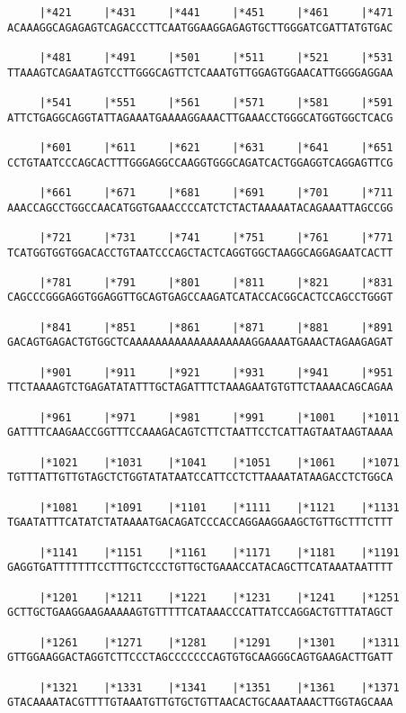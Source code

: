 \documentclass{article}
\begin{document}
\begin{Verbatim}
     |*421     |*431     |*441     |*451     |*461     |*471
ACAAAGGCAGAGAGTCAGACCCTTCAATGGAAGGAGAGTGCTTGGGATCGATTATGTGAC
  
     |*481     |*491     |*501     |*511     |*521     |*531
TTAAAGTCAGAATAGTCCTTGGGCAGTTCTCAAATGTTGGAGTGGAACATTGGGGAGGAA
  
     |*541     |*551     |*561     |*571     |*581     |*591
ATTCTGAGGCAGGTATTAGAAATGAAAAGGAAACTTGAAACCTGGGCATGGTGGCTCACG
  
     |*601     |*611     |*621     |*631     |*641     |*651
CCTGTAATCCCAGCACTTTGGGAGGCCAAGGTGGGCAGATCACTGGAGGTCAGGAGTTCG
  
     |*661     |*671     |*681     |*691     |*701     |*711
AAACCAGCCTGGCCAACATGGTGAAACCCCATCTCTACTAAAAATACAGAAATTAGCCGG
  
     |*721     |*731     |*741     |*751     |*761     |*771
TCATGGTGGTGGACACCTGTAATCCCAGCTACTCAGGTGGCTAAGGCAGGAGAATCACTT
  
     |*781     |*791     |*801     |*811     |*821     |*831
CAGCCCGGGAGGTGGAGGTTGCAGTGAGCCAAGATCATACCACGGCACTCCAGCCTGGGT
  
     |*841     |*851     |*861     |*871     |*881     |*891
GACAGTGAGACTGTGGCTCAAAAAAAAAAAAAAAAAAAGGAAAATGAAACTAGAAGAGAT
  
     |*901     |*911     |*921     |*931     |*941     |*951
TTCTAAAAGTCTGAGATATATTTGCTAGATTTCTAAAGAATGTGTTCTAAAACAGCAGAA
  
     |*961     |*971     |*981     |*991     |*1001    |*1011
GATTTTCAAGAACCGGTTTCCAAAGACAGTCTTCTAATTCCTCATTAGTAATAAGTAAAA
  
     |*1021    |*1031    |*1041    |*1051    |*1061    |*1071
TGTTTATTGTTGTAGCTCTGGTATATAATCCATTCCTCTTAAAATATAAGACCTCTGGCA
  
     |*1081    |*1091    |*1101    |*1111    |*1121    |*1131
TGAATATTTCATATCTATAAAATGACAGATCCCACCAGGAAGGAAGCTGTTGCTTTCTTT
  
     |*1141    |*1151    |*1161    |*1171    |*1181    |*1191
GAGGTGATTTTTTTCCTTTGCTCCCTGTTGCTGAAACCATACAGCTTCATAAATAATTTT
  
     |*1201    |*1211    |*1221    |*1231    |*1241    |*1251
GCTTGCTGAAGGAAGAAAAAGTGTTTTTCATAAACCCATTATCCAGGACTGTTTATAGCT
  
     |*1261    |*1271    |*1281    |*1291    |*1301    |*1311
GTTGGAAGGACTAGGTCTTCCCTAGCCCCCCCAGTGTGCAAGGGCAGTGAAGACTTGATT
  
     |*1321    |*1331    |*1341    |*1351    |*1361    |*1371
GTACAAAATACGTTTTGTAAATGTTGTGCTGTTAACACTGCAAATAAACTTGGTAGCAAA
  

\end{Verbatim}
\end{document}
